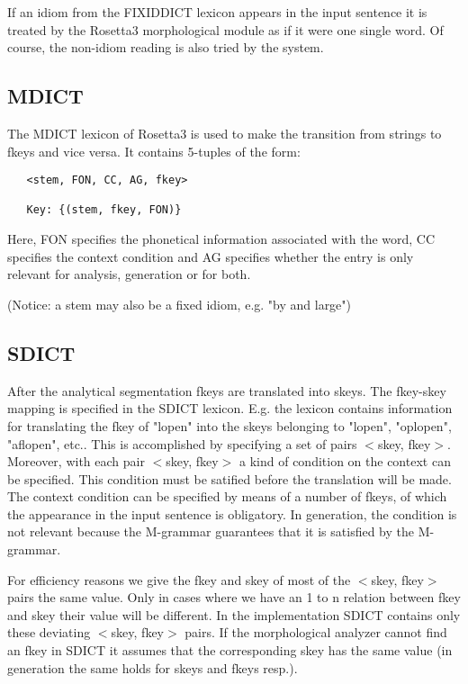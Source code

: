 If an idiom from the FIXIDDICT lexicon appears in the input sentence it is
treated by the Rosetta3 morphological module as if it were one single word.
Of course, the non-idiom reading is also tried by the system.

\subsection {MDICT}
The MDICT lexicon of Rosetta3 is used to make the transition from strings to
fkeys and vice versa. It contains 5-tuples of the form: 
\begin{verbatim}
   <stem, FON, CC, AG, fkey>

   Key: {(stem, fkey, FON)}

\end{verbatim}

Here, FON specifies the phonetical information associated with the word, CC
specifies the context condition and AG specifies whether the entry is only
relevant for analysis, generation or for both.

(Notice: a stem may also be a fixed idiom, e.g. "by and large")

\subsection {SDICT}
After the analytical segmentation fkeys are translated into skeys. The
fkey-skey mapping is specified in the SDICT lexicon. E.g. the lexicon contains
information for translating the fkey of "lopen" into the skeys belonging to
"lopen", "oplopen", "aflopen", etc.. This is accomplished by specifying a set
of pairs $<$skey, fkey$>$. Moreover, with each pair $<$skey, fkey$>$ a kind of 
condition on the context can be specified. This condition must be satified 
before the translation will be made. The context condition can be specified
by means of a number of fkeys, of which the appearance in the input sentence is
obligatory. In generation, the condition is not relevant because the M-grammar
guarantees that it is satisfied by the M-grammar.

For efficiency reasons we give the fkey and skey of most of the
$<$skey, fkey$>$ pairs the same value.
Only in cases where we have an 1 to n relation between fkey and skey their 
value will be different. In the implementation SDICT contains only these 
deviating $<$skey, fkey$>$ pairs. If the morphological analyzer cannot find an
fkey in SDICT it assumes that the corresponding  skey has the same value (in
generation the same holds for skeys and fkeys resp.).

